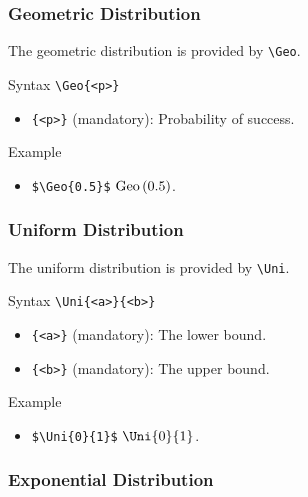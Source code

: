 \subsubsection{Geometric Distribution}

The geometric distribution is provided by \verb|\Geo|.

\begin{myframe}{Syntax }
    \verb|\Geo{<p>}|
    \begin{itemize}
        \item \verb|{<p>}| (mandatory): Probability of success.
    \end{itemize}
\end{myframe}

\begin{myframe}{Example }
    \begin{itemize}
        \item \verb|$\Geo{0.5}$| \produces{} $\Geo{0.5}$.
    \end{itemize}
\end{myframe}

\subsubsection{Uniform Distribution}

The uniform distribution is provided by \verb|\Uni|.

\begin{myframe}{Syntax }
    \verb|\Uni{<a>}{<b>}|
    \begin{itemize}
        \item \verb|{<a>}| (mandatory): The lower bound.
        \item \verb|{<b>}| (mandatory): The upper bound.
    \end{itemize}
\end{myframe}

\begin{myframe}{Example }
    \begin{itemize}
        \item \verb|$\Uni{0}{1}$| \produces{} $\Uni{0}{1}$.
    \end{itemize}
\end{myframe}

\subsubsection{Exponential Distribution}

